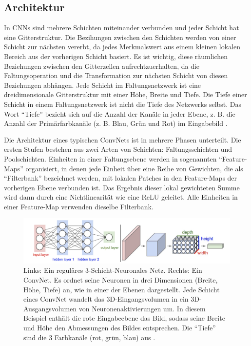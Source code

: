 \subsection{Architektur}
In CNNs sind mehrere Schichten miteinander verbunden und jeder Schicht hat eine Gitterstruktur. Die Bezihungen zwischen den Schichten werden von einer Schicht zur nächsten vererbt, da jedes Merkmalswert aus einem kleinen lokalen Bereich aus der vorherigen Schicht basiert. Es ist wichtig, diese räumlichen Beziehungen zwischen den Gitterzellen aufrechtzuerhalten, da die Faltungsoperation und die Transformation zur nächsten Schicht von diesen Beziehungen abhängen. Jede Schicht im Faltungsnetzwerk ist eine dreidimensionale Gitterstruktur mit einer Höhe, Breite und Tiefe. Die Tiefe einer Schicht in einem Faltungsnetzwerk ist nicht die Tiefe des Netzwerks selbst. Das Wort \enquote{Tiefe} bezieht sich auf die Anzahl der Kanäle in jeder Ebene, z. B. die Anzahl der Primärfarbkanäle (z. B. Blau, Grün und Rot) im Eingabebild \cite*[318]{Aggarwal2018}.

Die Architektur eines typischen ConvNets ist in mehrere Phasen unterteilt. Die ersten Stufen bestehen aus zwei Arten von Schichten: Faltungsschichten und Poolschichten. Einheiten in einer Faltungsebene werden in sogenannten \enquote{Feature-Maps} organisiert, in denen jede Einheit über eine Reihe von Gewichten, die als \enquote{Filterbank} bezeichnet werden, mit lokalen Patches in den Feature-Maps der vorherigen Ebene verbunden ist. Das Ergebnis dieser lokal gewichteten Summe wird dann durch eine Nichtlinearität wie \zb eine ReLU geleitet. Alle Einheiten in einer Feature-Map verwenden dieselbe Filterbank\cite*{Lecun2015}.


\begin{figure}[H]
    \centering
    \includegraphics[width=13cm]{kapitel2/conv.png}
    \caption[Vergleich eines NN mit einem CNN]{Links: Ein reguläres 3-Schicht-Neuronales Netz. Rechts: Ein ConvNet. Es ordnet seine Neuronen in drei Dimensionen (Breite, Höhe, Tiefe) an, wie in einer der Ebenen dargestellt. Jede Schicht eines ConvNet wandelt das 3D-Eingangsvolumen in ein 3D-Ausgangsvolumen von Neuronenaktivierungen um. In diesem Beispiel enthält die rote Eingabeebene das Bild, sodass seine Breite und Höhe den Abmessungen des Bildes entsprechen. Die \enquote{Tiefe} sind die 3 Farbkanäle (rot, grün, blau) aus \cite*{StanfordUniversityCoursecs231n2018a}.}
    \label{Kap2:Conv}
\end{figure}



